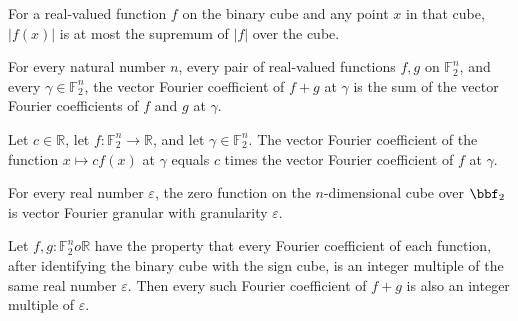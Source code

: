 \begin{theorem}
\label{FABL.abs_le_binaryFunctionInfinityNorm}
\leanok
{}
For a real-valued function $f$ on the binary cube and any point $x$ in that cube,
$|f(x)|$ is at most the supremum of $|f|$ over the cube.
\end{theorem}

\begin{theorem}
\label{FABL.vectorFourierCoeff_add}
\leanok
{}
For every natural number $n$, every pair of real-valued functions $f,g$ on
$\mathbb{F}_2^n$, and every $\gamma\in\mathbb{F}_2^n$, the vector Fourier coefficient of
$f+g$ at $\gamma$ is the sum of the vector Fourier coefficients of $f$ and $g$ at
$\gamma$.
\end{theorem}

\begin{theorem}
\label{FABL.vectorFourierCoeff_const_mul}
\leanok
{}
Let $c\in\mathbb R$, let $f\colon\mathbb F_2^n\to\mathbb R$, and let $\gamma\in\mathbb
F_2^n$. The vector Fourier coefficient of the function $x\mapsto c f(x)$ at $\gamma$
equals $c$ times the vector Fourier coefficient of $f$ at $\gamma$.
\end{theorem}

\begin{theorem}
\label{FABL.isVectorFourierGranular_zero}
\leanok
{}
For every real number $\varepsilon$, the zero function on the $n$-dimensional cube over
$\bbf_2$ is vector Fourier granular with granularity $\varepsilon$.
\end{theorem}

\begin{theorem}
\label{FABL.IsVectorFourierGranular.add}
\leanok
{}
Let $f,g:\mathbb{F}_2^n	o\mathbb{R}$ have the property that every Fourier coefficient of each function,
after identifying the binary cube with the sign cube, is an integer multiple of the same
real number $\varepsilon$. Then every such Fourier coefficient of $f+g$ is also an
integer multiple of $\varepsilon$.
\end{theorem}

